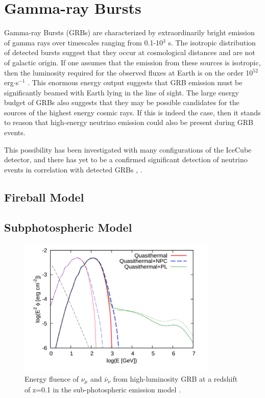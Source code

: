 \documentclass{gatech-thesis}
\begin{document}
\section{Gamma-ray Bursts}
Gamma-ray Bursts (GRBs) are characterized by extraordinarily bright emission of gamma rays over timescales ranging from 0.1-10$^3$ s. The isotropic distribution of detected bursts suggest that they occur at cosmological distances and are not of galactic origin. If one assumes that the emission from these sources is isotropic, then the luminosity required for the observed fluxes at Earth is on the order 10$^{52}$ erg$\cdot$s$^{-1}$ \cite{2004RvMP...76.1143P}. This enormous energy output suggests that GRB emission must be significantly beamed with Earth lying in the line of sight. The large energy budget of GRBs also suggests that they may be possible candidates for the sources of the highest energy cosmic rays. If this is indeed the case, then it stands to reason that high-energy neutrino emission could also be present during GRB events.

This possibility has been investigated with many configurations of the IceCube detector, and there has yet to be a confirmed significant detection of neutrino events in correlation with detected GRBs \cite{2011PhRvL.106n1101A}, \cite{2012Natur.484..351I}.
\subsection{Fireball Model}


\subsection{Subphotospheric Model}

\begin{figure}[ht]
  \begin{center}
    \includegraphics[width=0.85\textwidth,keepaspectratio]{SubPhotoFluence.png}
  \end{center}
  \caption{Energy fluence of $\nu_{\mu}$ and $\bar{\nu}_{\nu}$ from high-luminosity GRB at a redshift of z=0.1 in the sub-photospheric emission model \cite{2013PhRvL.111m1102M}.}
  \label{fig:subphotospheric_nus}
\end{figure}
\end{document}
